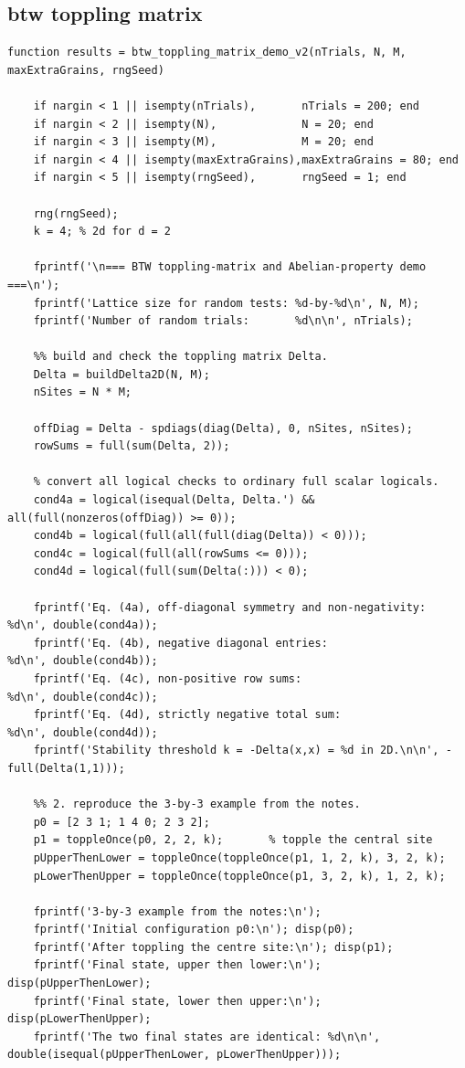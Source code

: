 \documentclass{article}
\begin{document}
\subsection{btw toppling matrix}
\begin{lstlisting}
function results = btw_toppling_matrix_demo_v2(nTrials, N, M, maxExtraGrains, rngSeed)

    if nargin < 1 || isempty(nTrials),       nTrials = 200; end
    if nargin < 2 || isempty(N),             N = 20; end
    if nargin < 3 || isempty(M),             M = 20; end
    if nargin < 4 || isempty(maxExtraGrains),maxExtraGrains = 80; end
    if nargin < 5 || isempty(rngSeed),       rngSeed = 1; end

    rng(rngSeed);
    k = 4; % 2d for d = 2

    fprintf('\n=== BTW toppling-matrix and Abelian-property demo ===\n');
    fprintf('Lattice size for random tests: %d-by-%d\n', N, M);
    fprintf('Number of random trials:       %d\n\n', nTrials);

    %% build and check the toppling matrix Delta.
    Delta = buildDelta2D(N, M);
    nSites = N * M;

    offDiag = Delta - spdiags(diag(Delta), 0, nSites, nSites);
    rowSums = full(sum(Delta, 2));

    % convert all logical checks to ordinary full scalar logicals.
    cond4a = logical(isequal(Delta, Delta.') && all(full(nonzeros(offDiag)) >= 0));
    cond4b = logical(full(all(full(diag(Delta)) < 0)));
    cond4c = logical(full(all(rowSums <= 0)));
    cond4d = logical(full(sum(Delta(:))) < 0);

    fprintf('Eq. (4a), off-diagonal symmetry and non-negativity: %d\n', double(cond4a));
    fprintf('Eq. (4b), negative diagonal entries:                %d\n', double(cond4b));
    fprintf('Eq. (4c), non-positive row sums:                    %d\n', double(cond4c));
    fprintf('Eq. (4d), strictly negative total sum:              %d\n', double(cond4d));
    fprintf('Stability threshold k = -Delta(x,x) = %d in 2D.\n\n', -full(Delta(1,1)));

    %% 2. reproduce the 3-by-3 example from the notes.
    p0 = [2 3 1; 1 4 0; 2 3 2];
    p1 = toppleOnce(p0, 2, 2, k);       % topple the central site
    pUpperThenLower = toppleOnce(toppleOnce(p1, 1, 2, k), 3, 2, k);
    pLowerThenUpper = toppleOnce(toppleOnce(p1, 3, 2, k), 1, 2, k);

    fprintf('3-by-3 example from the notes:\n');
    fprintf('Initial configuration p0:\n'); disp(p0);
    fprintf('After toppling the centre site:\n'); disp(p1);
    fprintf('Final state, upper then lower:\n'); disp(pUpperThenLower);
    fprintf('Final state, lower then upper:\n'); disp(pLowerThenUpper);
    fprintf('The two final states are identical: %d\n\n', double(isequal(pUpperThenLower, pLowerThenUpper)));


\end{lstlisting}
\end{document}
